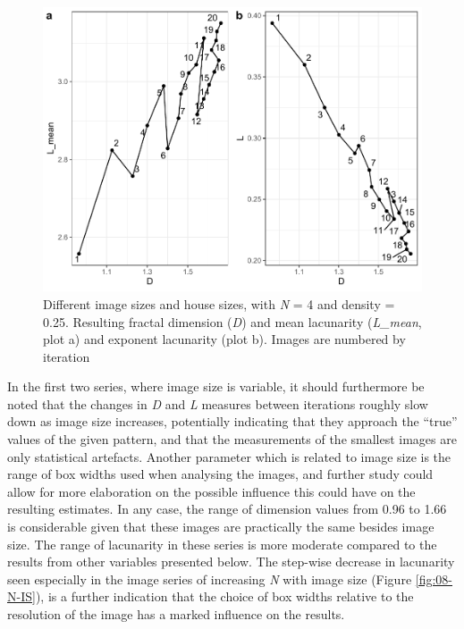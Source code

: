 \documentclass[
  12pt,
]{book}
\begin{document}
\begin{figure}

{\centering \includegraphics[width=0.9\linewidth]{bookdown-demo_files/figure-latex/08-IS-HS-1} 

}

\caption{Different image sizes and house sizes, with \emph{N} = 4 and density = 0.25. Resulting fractal dimension (\emph{D}) and mean lacunarity (\emph{L\_mean}, plot a) and exponent lacunarity (plot b). Images are numbered by iteration}\label{fig:08-IS-HS}
\end{figure}

In the first two series, where image size is variable, it should furthermore be noted that the changes in \emph{D} and \emph{L} measures between iterations roughly slow down as image size increases, potentially indicating that they approach the ``true'' values of the given pattern, and that the measurements of the smallest images are only statistical artefacts. Another parameter which is related to image size is the range of box widths used when analysing the images, and further study could allow for more elaboration on the possible influence this could have on the resulting estimates. In any case, the range of dimension values from 0.96 to 1.66 is considerable given that these images are practically the same besides image size. The range of lacunarity in these series is more moderate compared to the results from other variables presented below. The step-wise decrease in lacunarity seen especially in the image series of increasing \emph{N} with image size (Figure \ref{fig:08-N-IS}), is a further indication that the choice of box widths relative to the resolution of the image has a marked influence on the results.
\end{document}

